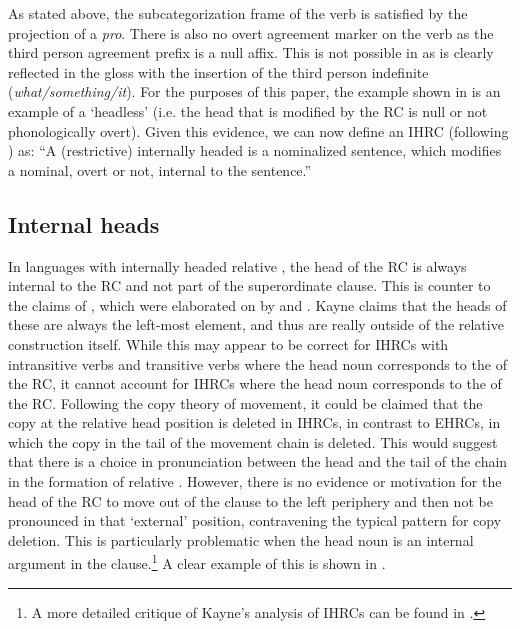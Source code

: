 \documentclass[output=paper]{LSP/langsci}
\begin{document}
As stated above, the subcategorization frame of the verb is satisfied by the projection of a \textit{pro}. There is also no overt agreement marker on the verb as the third person agreement prefix is a null affix. This is not possible in  as is clearly reflected in the gloss with the insertion of the  third person indefinite (\textit{what/something/it}). For the purposes of this paper, the example shown in  is an example of a `headless'  (i.e. the head that is modified by the RC is null or not phonologically overt). Given this evidence, we can now define an IHRC (following \citealt[27]{Culy1990}) as: ``A (restrictive) internally headed  is a nominalized sentence, which modifies a nominal, overt or not, internal to the sentence.'' 

\subsection{Internal heads}\label{sec:boyle:3.1}

In languages with internally headed relative , the head of the RC is always internal to the RC and not part of the superordinate clause. This is counter to the claims of \citet{Kayne1994}, which were elaborated on by \citet{Bianchi1999} and \citet{DiSciullo2005}. Kayne claims that the heads of these  are always the left-most element, and thus are really outside of the relative construction itself.  While this may appear to be correct for IHRCs with intransitive verbs and transitive verbs where the head noun corresponds to the  of the RC, it cannot account for IHRCs where the head noun corresponds to the  of the RC. Following the copy theory of movement, it could be claimed that the copy at the relative head position is deleted in IHRCs, in contrast to EHRCs, in which the copy in the tail of the movement chain is deleted. This would suggest that there is a choice in pronunciation between the head and the tail of the chain in the formation of relative . However, there is no evidence or motivation for the head of the RC to move out of the clause to the left periphery and then not be pronounced in that `external' position, contravening the typical pattern for copy deletion. This is particularly problematic when the head noun is an internal argument in the clause.\footnote{A more detailed critique of Kayne's analysis of IHRCs can be found in \citet{Boyle2007}.}  A clear example of this is shown in .
\end{document}
